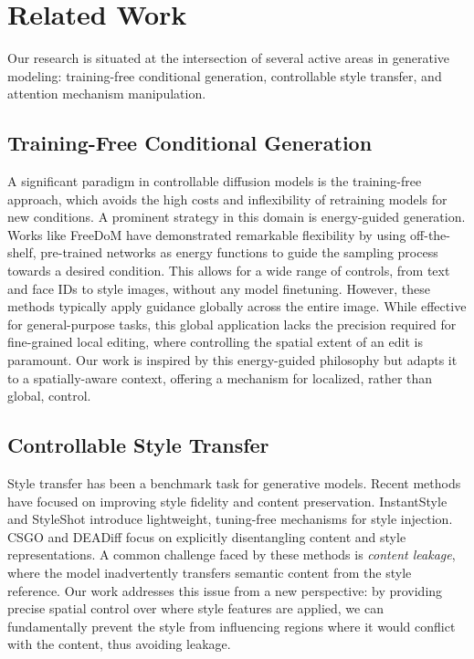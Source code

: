\section{Related Work}

Our research is situated at the intersection of several active areas in generative modeling: training-free conditional generation, controllable style transfer, and attention mechanism manipulation.

\subsection{Training-Free Conditional Generation}
A significant paradigm in controllable diffusion models is the training-free approach, which avoids the high costs and inflexibility of retraining models for new conditions. A prominent strategy in this domain is energy-guided generation. Works like FreeDoM \cite{shi2023freedom} have demonstrated remarkable flexibility by using off-the-shelf, pre-trained networks as energy functions to guide the sampling process towards a desired condition. This allows for a wide range of controls, from text and face IDs to style images, without any model finetuning. However, these methods typically apply guidance globally across the entire image. While effective for general-purpose tasks, this global application lacks the precision required for fine-grained local editing, where controlling the spatial extent of an edit is paramount. Our work is inspired by this energy-guided philosophy but adapts it to a spatially-aware context, offering a mechanism for localized, rather than global, control.

\subsection{Controllable Style Transfer}
Style transfer has been a benchmark task for generative models. Recent methods have focused on improving style fidelity and content preservation. InstantStyle \cite{wang2024instantstyle} and StyleShot \cite{gao2024styleshot} introduce lightweight, tuning-free mechanisms for style injection. CSGO \cite{xing2024csgo} and DEADiff \cite{qi2024deadiff} focus on explicitly disentangling content and style representations. A common challenge faced by these methods is \textit{content leakage}, where the model inadvertently transfers semantic content from the style reference. Our work addresses this issue from a new perspective: by providing precise spatial control over where style features are applied, we can fundamentally prevent the style from influencing regions where it would conflict with the content, thus avoiding leakage.

